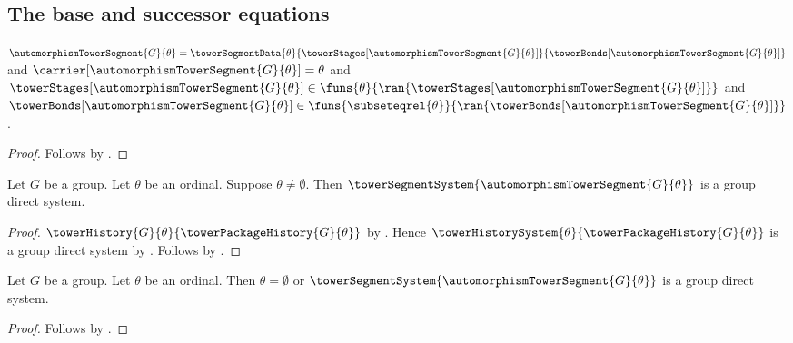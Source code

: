 \subsection{The base and successor equations}

\begin{proposition}\label{automorphism_tower_segment_data_laws}
    $\automorphismTowerSegment{G}{\theta}=
            \towerSegmentData{\theta}
                {\towerStages[\automorphismTowerSegment{G}{\theta}]}
                {\towerBonds[\automorphismTowerSegment{G}{\theta}]}$ and
        $\carrier[\automorphismTowerSegment{G}{\theta}]=\theta$ and
        $\towerStages[\automorphismTowerSegment{G}{\theta}]\in
            \funs{\theta}{\ran{\towerStages[
                \automorphismTowerSegment{G}{\theta}]}}$ and
        $\towerBonds[\automorphismTowerSegment{G}{\theta}]\in
            \funs{\subseteqrel{\theta}}{\ran{\towerBonds[
                \automorphismTowerSegment{G}{\theta}]}}$.
\end{proposition}
\begin{proof}
    Follows by
        .
\end{proof}

\begin{proposition}\label{automorphism_tower_nonempty_system}
    Let $G$ be a group.
    Let $\theta$ be an ordinal.
    Suppose $\theta\neq\emptyset$.
    Then $\towerSegmentSystem{
        \automorphismTowerSegment{G}{\theta}}$ is a group direct system.
\end{proposition}
\begin{proof}
    $\towerHistory{G}{\theta}{\towerPackageHistory{G}{\theta}}$ by
        .
    Hence $\towerHistorySystem{\theta}{\towerPackageHistory{G}{\theta}}$
        is a group direct system by
        .
    Follows by .
\end{proof}

\begin{proposition}\label{automorphism_tower_system_law}
    Let $G$ be a group.
    Let $\theta$ be an ordinal.
    Then $\theta=\emptyset$ or
        $\towerSegmentSystem{\automorphismTowerSegment{G}{\theta}}$
            is a group direct system.
\end{proposition}
\begin{proof}
    Follows by .
\end{proof}

